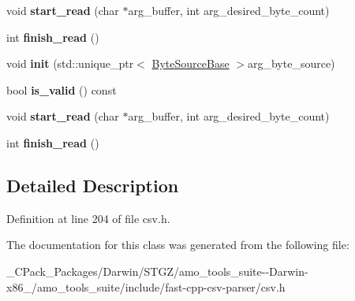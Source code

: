 \begin{DoxyCompactItemize}
\mbox{\label{classio_1_1detail_1_1_asynchronous_reader_a9818851dbb994042d0d84183220e71c6}} 
void {\bfseries start\+\_\+read} (char $\ast$arg\+\_\+buffer, int arg\+\_\+desired\+\_\+byte\+\_\+count)
\item 
\mbox{\label{classio_1_1detail_1_1_asynchronous_reader_a94520530423e9bfeb04c23ea4e3a8786}} 
int {\bfseries finish\+\_\+read} ()
\item 
\mbox{\label{classio_1_1detail_1_1_asynchronous_reader_a12ed45f881a671b473d95ded7ad1474c}} 
void {\bfseries init} (std\+::unique\+\_\+ptr$<$ \hyperlink{classio_1_1_byte_source_base}{Byte\+Source\+Base} $>$arg\+\_\+byte\+\_\+source)
\item 
\mbox{\label{classio_1_1detail_1_1_asynchronous_reader_ab6b6f8483008208fc3f529f94c7125e2}} 
bool {\bfseries is\+\_\+valid} () const
\item 
\mbox{\label{classio_1_1detail_1_1_asynchronous_reader_a9818851dbb994042d0d84183220e71c6}} 
void {\bfseries start\+\_\+read} (char $\ast$arg\+\_\+buffer, int arg\+\_\+desired\+\_\+byte\+\_\+count)
\item 
\mbox{\label{classio_1_1detail_1_1_asynchronous_reader_a94520530423e9bfeb04c23ea4e3a8786}} 
int {\bfseries finish\+\_\+read} ()
\end{DoxyCompactItemize}


\subsection{Detailed Description}


Definition at line 204 of file csv.\+h.



The documentation for this class was generated from the following file\+:\begin{DoxyCompactItemize}
\item 
\+\_\+\+C\+Pack\+\_\+\+Packages/\+Darwin/\+S\+T\+G\+Z/amo\+\_\+tools\+\_\+suite-\/-\/\+Darwin-\/x86\+\_/amo\+\_\+tools\+\_\+suite/include/fast-\/cpp-\/csv-\/parser/csv.\+h\end{DoxyCompactItemize}

